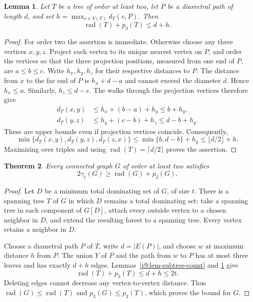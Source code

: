 \documentclass[11pt,a4paper]{article}
\newtheorem{theorem}{Theorem}[section]
\newtheorem{lemma}[theorem]{Lemma}
\theoremstyle{remark}
\begin{document}
\begin{lemma}\label{r9:lem-tree-dispersion}
Let $T$ be a tree of order at least two, let $P$ be a diametral path
of length $d$, and set $h=\max_{v\in V(T)}d_T(v,P)$. Then
\[
 \operatorname{rad}(T)+p_3(T)\le d+h.
\]
\end{lemma}
\begin{proof}
For order two the assertion is immediate. Otherwise choose any
three vertices $x,y,z$. Project each vertex to its unique nearest
vertex on $P$, and order the vertices so that the three projection
positions, measured from one end of $P$, are $a\le b\le c$.
Write $h_x,h_y,h_z$ for their respective distances to $P$.
The distance from $x$ to the far end of $P$ is $h_x+d-a$ and
cannot exceed the diameter $d$. Hence $h_x\le a$.
Similarly, $h_z\le d-c$. The walks through the projection
vertices therefore give
\begin{align*}
 d_T(x,y)&\le h_x+(b-a)+h_y\le b+h_y,\\
 d_T(y,z)&\le h_y+(c-b)+h_z\le d-b+h_y.
\end{align*}
These are upper bounds even if projection vertices coincide.
Consequently,
\[
 \min\{d_T(x,y),d_T(y,z),d_T(z,x)\}
 \le \min\{b,d-b\}+h_y
 \le \lfloor d/2\rfloor+h.
\]
Maximizing over triples and using
$\operatorname{rad}(T)=\lceil d/2\rceil$ proves the assertion.
\end{proof}

\begin{theorem}\label{r9:thm-radius-dispersion}
Every connected graph $G$ of order at least two satisfies
\[
 2\gamma_t(G)\ge\operatorname{rad}(G)+p_3(G).
\]
\end{theorem}
\begin{proof}
Let $D$ be a minimum total dominating set of $G$, of size $t$.
There is a spanning tree $T$ of $G$ in which $D$ remains a total
dominating set: take a spanning tree in each component of $G[D]$,
attach every outside vertex to a chosen neighbor in $D$, and extend
the resulting forest to a spanning tree. Every vertex retains a
neighbor in $D$.

Choose a diametral path $P$ of $T$, write $d=|E(P)|$, and choose
$w$ at maximum distance $h$ from $P$. The union $Y$ of $P$ and
the path from $w$ to $P$ has at most three leaves and has exactly
$d+h$ edges. Lemmas~\ref{r9:lem-subtree-count} and
\ref{r9:lem-tree-dispersion} give
\[
 \operatorname{rad}(T)+p_3(T)\le d+h\le2t.
\]
Deleting edges cannot decrease any vertex-to-vertex distance. Thus
$\operatorname{rad}(G)\le\operatorname{rad}(T)$ and
$p_3(G)\le p_3(T)$, which proves the bound for $G$.
\end{proof}
\end{document}
